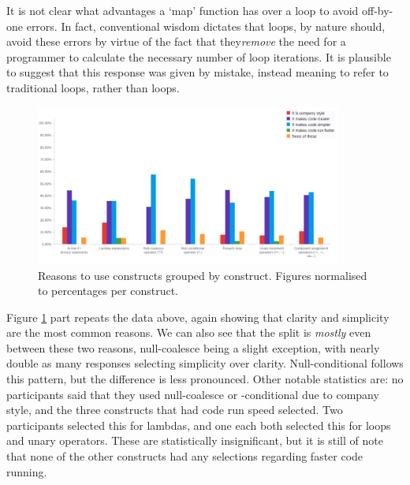 \documentclass{article}
\begin{document}
            It is not clear what advantages a `map' function has over a  loop to avoid off-by-one errors. In fact, conventional wisdom dictates that  loops, by nature should, avoid these errors by virtue of the fact that they\emph{remove} the need for a programmer to calculate the necessary number of loop iterations. It is plausible to suggest that this response was given by mistake, instead meaning to refer to traditional  loops, rather than  loops.
            \begin{figure}[htbp]
                \centering
                \includegraphics[width=0.9\textwidth]{toUse}
                \caption{Reasons to use constructs grouped by construct. Figures normalised to percentages per construct.}
                \label{fig:toUse}
            \end{figure}

            Figure \ref{fig:toUse} part repeats the data above, again showing that clarity and simplicity are the most common reasons. We can also see that the split is \emph{mostly} even between these two reasons, null-coalesce being a slight exception, with nearly double as many responses selecting simplicity over clarity. Null-conditional follows this pattern, but the difference is less pronounced.
            Other notable statistics are: no participants said that they used null-coalesce or -conditional due to company style, and the three constructs that had code run speed selected. Two participants selected this for lambdas, and one each both selected this for  loops and unary operators. These are statistically insignificant, but it is still of note that none of the other constructs had any selections regarding faster code running.
\end{document}
